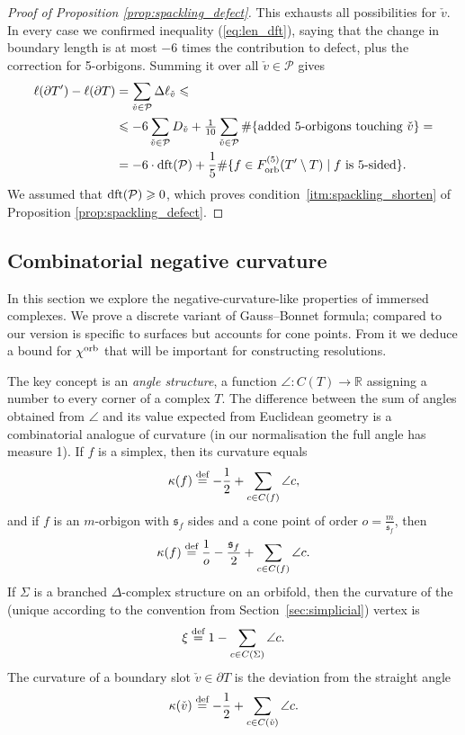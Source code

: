 \documentclass{amsart}
\newcommand{\cho}{\chi^{\textnormal{orb}}}
\newcommand{\defeq}{\stackrel{\tn{def}}{=}}
\newcommand{\dft}{\textnormal{dft}}
\newcommand{\Forb}[1][m]{F^{(#1)}_{\textnormal{orb}}}
\newcommand{\tn}{\textnormal}
\begin{document}
\begin{proof}[Proof of Proposition \ref{prop:spackling_defect}]
This exhausts all possibilities for $\check{v}$. In every case we confirmed inequality (\ref{eq:len_dft}), saying that the change in boundary length is at most $-6$ times the contribution to defect, plus the correction for 5-orbigons. Summing it over all $\check{v}\in\mathcal{P}$ gives
\begin{align*}
\ell(\partial T')-\ell(\partial T)&=\sum_{\check{v}\in\mathcal{P}}\Delta\ell_{\check{v}}\leqslant\\
&\leqslant-6\sum_{\check{v}\in\mathcal{P}}D_{\check{v}}+\tfrac{1}{10}\sum_{\check{v}\in\mathcal{P}}\#\{\tn{added }5\tn{-orbigons touching }\check{v}\}=\\
&=-6\cdot\dft(\mathcal{P})+\frac{1}{5}\#\{f\in\Forb[5](T'\setminus T)\mid f\text{ is }5\text{-sided}\}.
\end{align*}
We assumed that $\dft(\mathcal{P})\geqslant0$, which proves condition~\ref*{itm:spackling_shorten} of Proposition \ref{prop:spackling_defect}.
\end{proof}

\subsection{Combinatorial negative curvature}\label{ssec:combi_negcurv}

In this section we explore the negative-curvature-like properties of immersed complexes. We prove a discrete variant of Gauss--Bonnet formula; compared to \cite[Theorem 2.3]{sectional_curvature_cpct_cores_local_quasiconvexity_Wise04} our version is specific to surfaces but accounts for cone points. From it we deduce a bound for $\cho$ that will be important for constructing resolutions.

The key concept is an \emph{angle structure}, a function $\angle\colon C(T)\to\mathbb{R}$ assigning a number to every corner of a complex $T$. The difference between the sum of angles obtained from $\angle$ and its value expected from Euclidean geometry is a combinatorial analogue of curvature (in our normalisation the full angle has measure 1). If $f$ is a simplex, then its curvature equals
\begin{equation*}
\kappa(f)\defeq-\frac{1}{2}+\sum_{c\in C(f)}\angle c,
\end{equation*}
and if $f$ is an $m$-orbigon with $\mathfrak{s}_f$ sides and a cone point of order $o=\tfrac{m}{\mathfrak{s}_f}$, then
\begin{equation*}
\kappa(f)\defeq\frac{1}{o}-\frac{\mathfrak{s}_f}{2}+\sum_{c\in C(f)}\angle c.
\end{equation*}
If $\Sigma$ is a branched $\Delta$-complex structure on an orbifold, then the curvature of the (unique according to the convention from Section~\ref{sec:simplicial}) vertex is
\begin{equation*}
\xi\defeq1-\sum_{c\in C(\Sigma)}\angle c.
\end{equation*}
The curvature of a boundary slot $\check{v}\in\partial T$ is the deviation from the straight angle
\begin{equation}\label{eq:curv_site}
\kappa(\check{v})\defeq-\frac{1}{2}+\sum_{c\in C(\check{v})}\angle c.
\end{equation}
\end{document}
